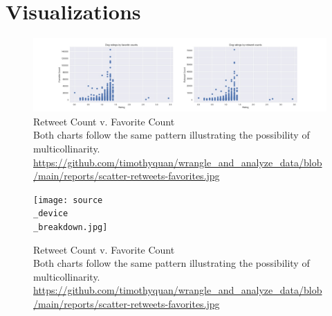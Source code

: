 \documentclass[10pt,a4paper]{article}
\begin{document}
    \section{Visualizations}
        \begin{figure}[h]
            \centering
            \includegraphics[width=1\textwidth]{scatter-retweets-favorites.jpg}            
            \caption{Retweet Count v. Favorite Count \\ Both charts follow the same pattern illustrating the possibility of
            multicollinarity.\\\url{https://github.com/timothyquan/wrangle_and_analyze_data/blob/main/reports/scatter-retweets-favorites.jpg} }            
        \end{figure}
        \begin{figure}[h]
            \centering
            \texttt{[image: source\\\_device\\\_breakdown.jpg]}            

            \caption{Retweet Count v. Favorite Count \\ Both charts follow the same pattern illustrating the possibility of
            multicollinarity.\\\url{https://github.com/timothyquan/wrangle_and_analyze_data/blob/main/reports/scatter-retweets-favorites.jpg} }            
        \end{figure}
\end{document}

